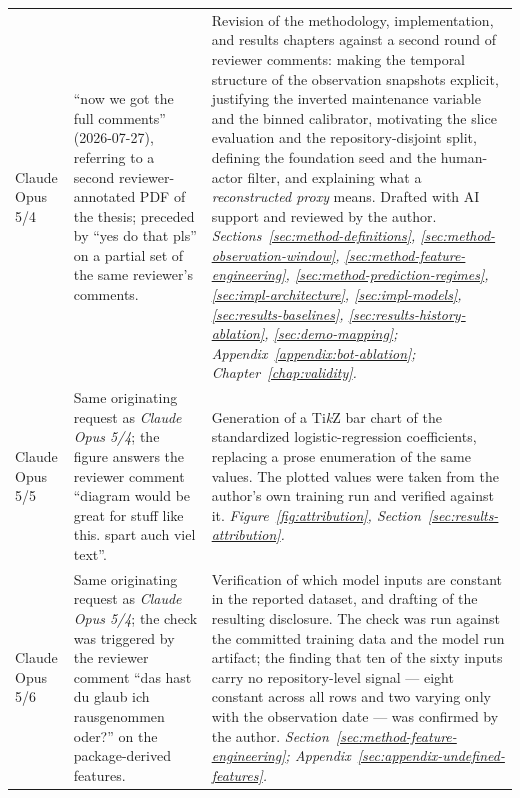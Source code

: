 {\begin{longtable}{p{} p{} p{}}
Claude Opus 5/4
& ``now we got the full comments'' (2026-07-27), referring to a second
reviewer-annotated PDF of the thesis; preceded by ``yes do that pls'' on a partial set of
the same reviewer's comments.
& Revision of the methodology, implementation, and results chapters against a second
round of reviewer comments: making the temporal structure of the observation snapshots
explicit, justifying the inverted maintenance variable and the binned calibrator,
motivating the slice evaluation and the repository-disjoint split, defining the
foundation seed and the human-actor filter, and explaining what a \emph{reconstructed
proxy} means. Drafted with AI support and reviewed by the author. \newline
\emph{Sections~\ref{sec:method-definitions}, \ref{sec:method-observation-window},
\ref{sec:method-feature-engineering}, \ref{sec:method-prediction-regimes},
\ref{sec:impl-architecture}, \ref{sec:impl-models}, \ref{sec:results-baselines},
\ref{sec:results-history-ablation}, \ref{sec:demo-mapping};
Appendix~\ref{appendix:bot-ablation}; Chapter~\ref{chap:validity}.} \\

Claude Opus 5/5
& Same originating request as \emph{Claude Opus 5/4}; the figure answers the reviewer
comment ``diagram would be great for stuff like this. spart auch viel text''.
& Generation of a Ti\emph{k}Z bar chart of the standardized logistic-regression
coefficients, replacing a prose enumeration of the same values. The plotted values were
taken from the author's own training run and verified against it. \newline
\emph{Figure~\ref{fig:attribution}, Section~\ref{sec:results-attribution}.} \\

Claude Opus 5/6
& Same originating request as \emph{Claude Opus 5/4}; the check was triggered by the
reviewer comment ``das hast du glaub ich rausgenommen oder?'' on the package-derived
features.
& Verification of which model inputs are constant in the reported dataset, and drafting
of the resulting disclosure. The check was run against the committed training data and
the model run artifact; the finding that ten of the sixty inputs carry no
repository-level signal --- eight constant across all rows and two varying only with the
observation date --- was confirmed by the author. \newline
\emph{Section~\ref{sec:method-feature-engineering};
Appendix~\ref{sec:appendix-undefined-features}.} \\


\end{longtable}}
